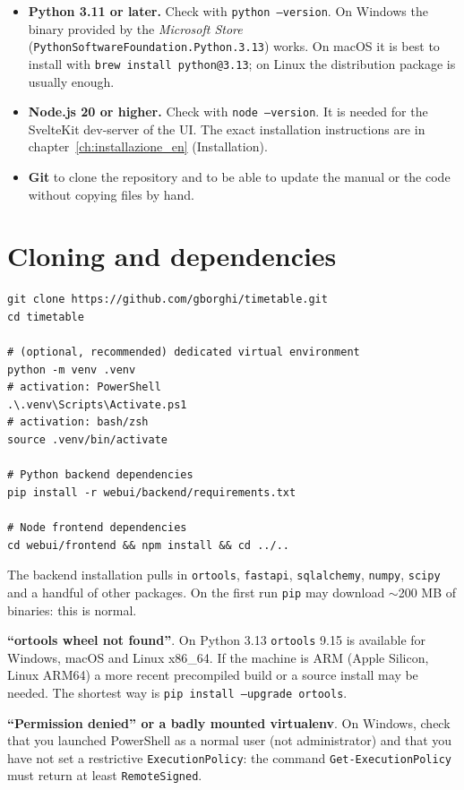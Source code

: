 \begin{itemize}
\item \textbf{Python 3.11 or later.} Check with
  \texttt{python --version}. On Windows the binary provided by the
  \emph{Microsoft Store}
  (\texttt{PythonSoftwareFoundation.Python.3.13}) works. On macOS
  it is best to install with \texttt{brew install python@3.13};
  on Linux the distribution package is usually enough.
\item \textbf{Node.js 20 or higher.} Check with
  \texttt{node --version}. It is needed for the SvelteKit
  dev-server of the UI. The exact installation instructions are
  in chapter~\ref{ch:installazione_en} (Installation).
\item \textbf{Git} to clone the repository and to be able to
  update the manual or the code without copying files by hand.
\end{itemize}

\section{Cloning and dependencies}


\begin{lstlisting}[style=shell]
git clone https://github.com/gborghi/timetable.git
cd timetable

# (optional, recommended) dedicated virtual environment
python -m venv .venv
# activation: PowerShell
.\.venv\Scripts\Activate.ps1
# activation: bash/zsh
source .venv/bin/activate

# Python backend dependencies
pip install -r webui/backend/requirements.txt

# Node frontend dependencies
cd webui/frontend && npm install && cd ../..
\end{lstlisting}

The backend installation pulls in \texttt{ortools},
\texttt{fastapi}, \texttt{sqlalchemy}, \texttt{numpy}, \texttt{scipy}
and a handful of other packages. On the first run \texttt{pip}
may download $\sim$200 MB of binaries: this is normal.

\begin{erroricomunibox}
\textbf{``ortools wheel not found''}. On Python 3.13
\texttt{ortools} 9.15 is available for Windows, macOS and
Linux x86\_64. If the machine is ARM (Apple Silicon, Linux
ARM64) a more recent precompiled build or a source install may
be needed. The shortest way is
\texttt{pip install --upgrade ortools}.

\textbf{``Permission denied'' or a badly mounted virtualenv}.
On Windows, check that you launched PowerShell as a normal
user (not administrator) and that you have not set a
restrictive \texttt{ExecutionPolicy}: the command
\texttt{Get-ExecutionPolicy} must return at least
\texttt{RemoteSigned}.
\end{erroricomunibox}


